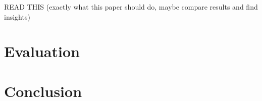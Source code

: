 \documentclass[a4paper]{article}
\begin{document}
READ THIS \cite{intento-2020} (exactly what this paper should do, maybe compare results and find insights)

\section{Evaluation}

\section{Conclusion}

\printbibliography
\end{document}
